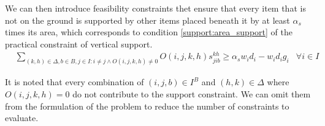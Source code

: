 We can then introduce feasibility constraints thet ensure that every item that is not on the ground is supported by other items placed beneath it by at least $\alpha_s$ times its area, which corresponds to condition \ref{support:area_support} of the practical constraint of vertical support.
\begin{eqnarray}
    & \sum\limits_{(k, h) \in \Delta, b \in B, j \in I : i \neq j \land O(i, j, k, h) \neq 0}{ O(i, j, k, h)s^{k h}_{j i b}} \ge \alpha_s w_i d_i - w_i d_i g_i & \forall i \in I \label{cons:every_item_is_supported}
\end{eqnarray}

It is noted that every combination of $(i,j,b) \in I^B$ and $(h,k) \in \Delta$ where $O(i, j, k, h) = 0$ do not contribute to the support constraint. We can omit them from the formulation of the problem to reduce the number of constraints to evaluate.